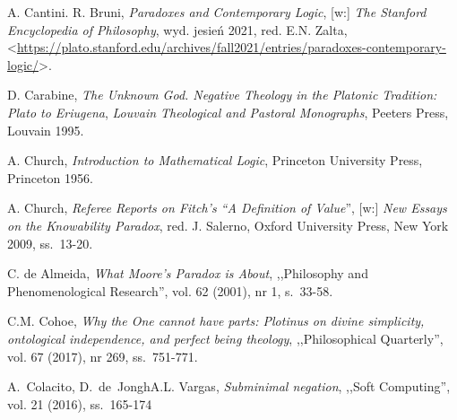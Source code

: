 \begin{thebibliography}{100}
A. Cantini. R. Bruni, \textit{Paradoxes and Contemporary Logic}, [w:] \textit{The Stanford Encyclopedia of Philosophy},
wyd. jesień 2021, red. E.N. Zalta, {\textless}\url{https://plato.stanford.edu/archives/fall2021/entries/paradoxes-contemporary-logic/}{\textgreater}.

D. Carabine, \textit{The Unknown God. Negative Theology in the Platonic Tradition: Plato to Eriugena}, \textit{Louvain Theological and Pastoral Monographs}, Peeters Press, Louvain 1995.



A. Church, \textit{Introduction to Mathematical Logic}, Princeton University Press, Princeton 1956.

A. Church, \textit{Referee Reports on Fitch's ``A Definition of Value}'', [w:] \textit{New Essays on the Knowability Paradox},
red. J. Salerno, Oxford University Press, New York 2009, ss.~13-20.

C. de Almeida, \textit{What Moore's Paradox is About}, ,,Philosophy and Phenomenological Research'', vol. 62 (2001), nr 1, s.~33-58.

C.M. Cohoe, \textit{Why the One cannot have parts: Plotinus on divine simplicity, ontological independence, and perfect being theology}, ,,Philosophical Quarterly'', vol. 67 (2017), nr 269, ss.~751-771.


A.~Colacito, D.~de~Jongh\bbland{}A.L. Vargas, \textit{Subminimal negation}, ,,Soft Computing'', vol. 21 (2016), ss.~165-174



\end{thebibliography}
